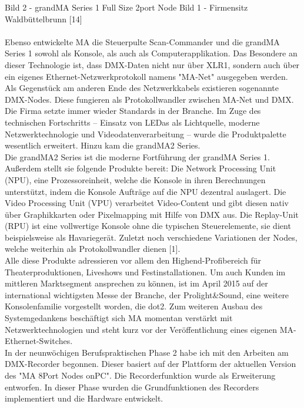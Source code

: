 \documentclass{scrartcl}
\begin{document}
Bild 2 - grandMA Series 1 Full Size 2port Node
Bild 1 - Firmensitz Waldbüttelbrunn [14]\\
\\
Ebenso entwickelte MA die Steuerpulte Scan-Commander und die grandMA Series 1 sowohl als
Konsole, als auch als Computerapplikation. Das Besondere an dieser Technologie ist, dass DMX-Daten
nicht nur über XLR1, sondern auch über ein eigenes Ethernet-Netzwerkprotokoll namens "MA-Net"
ausgegeben werden. Als Gegenstück am anderen Ende des Netzwerkkabels existieren sogenannte
DMX-Nodes. Diese fungieren als Protokollwandler zwischen MA-Net und DMX.\\
Die Firma setzte immer wieder Standards in der Branche. Im Zuge des technischen Fortschritts –
Einsatz von LEDas als Lichtquelle, moderne Netzwerktechnologie und Videodatenverarbeitung –
wurde die Produktpalette wesentlich erweitert. Hinzu kam die grandMA2 Series.\\
Die grandMA2 Series ist die moderne Fortführung der grandMA Series 1. Außerdem stellt sie
folgende Produkte bereit: Die Network Processing Unit (NPU), eine Prozessoreinheit, welche die
Konsole in ihren Berechnungen unterstützt, indem die Konsole Aufträge auf die NPU dezentral
auslagert. Die Video Processing Unit (VPU) verarbeitet Video-Content und gibt diesen nativ über
Graphikkarten oder Pixelmapping mit Hilfe von DMX aus. Die Replay-Unit (RPU) ist eine vollwertige
Konsole ohne die typischen Steuerelemente, sie dient beispielsweise als Havariegerät. Zuletzt noch
verschiedene Variationen der Nodes, welche weiterhin als Protokollwandler dienen [1].\\
Alle diese Produkte adressieren vor allem den Highend-Profibereich für Theaterproduktionen,
Liveshows und Festinstallationen. Um auch Kunden im mittleren Marktsegment ansprechen zu
können, ist im April 2015 auf der international wichtigsten Messe der Branche, der Prolight\&Sound,
eine weitere Konsolenfamilie vorgestellt worden, die dot2. Zum weiteren Ausbau des
Systemgedankens beschäftigt sich MA momentan verstärkt mit Netzwerktechnologien und steht kurz
vor der Veröffentlichung eines eigenen MA-Ethernet-Switches.\\
In der neunwöchigen Berufspraktischen Phase 2 habe ich mit den Arbeiten am DMX-Recorder
begonnen. Dieser basiert auf der Plattform der aktuellen Version des "MA 8Port Nodes onPC". Die
Recorderfunktion wurde als Erweiterung entworfen. In dieser Phase wurden die Grundfunktionen
des Recorders implementiert und die Hardware entwickelt.\\
\end{document}
